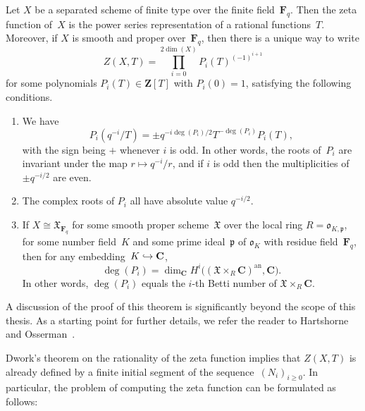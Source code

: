\begin{thm} \label{thm:01-Zetafunctions}
Let $X$ be a separated scheme of finite type over the finite 
field~$\mathbf{F}_q$.  Then the zeta function of~$X$ is the power series 
representation of a rational functions~$T$.  Moreover, if $X$ is smooth 
and proper over~$\mathbf{F}_q$, then there is a unique way to write 
\begin{equation}
Z(X, T) = \prod_{i=0}^{2 \dim(X)} P_i(T)^{(-1)^{i+1}}
\end{equation}
for some polynomials $P_i(T) \in \mathbf{Z}[T]$ with $P_i(0) = 1$, 
satisfying the following conditions.
\begin{enumerate}
\item We have 
\begin{equation*}
P_i(q^{-i} / T) = \pm q^{-i \deg(P_i) / 2} T^{- \deg(P_i)} P_i(T),
\end{equation*}
with the sign being $+$ whenever $i$ is odd.  In other words, the roots 
of~$P_i$ are invariant under the map $r \mapsto q^{-i} / r$, and if $i$ 
is odd then the multiplicities of $\pm q^{-i/2}$ are even.
\item The complex roots of $P_i$ all have absolute value $q^{-i/2}$.
\item If $X \cong \mathfrak{X}_{\mathbf{F}_q}$ for some smooth proper 
scheme~$\mathfrak{X}$ over the local ring $R = \mathfrak{o}_{K,\mathfrak{p}}$, 
for some number field~$K$ and some prime ideal~$\mathfrak{p}$ of 
$\mathfrak{o}_K$ with residue field~$\mathbf{F}_q$, then for any 
embedding~$K \hookrightarrow \mathbf{C}$, 
\begin{equation*}
\deg(P_i) = \dim_{\mathbf{C}} H^{i} \bigl( (\mathfrak{X} \times_R \mathbf{C})^{\text{an}}, \mathbf{C} \bigr).
\end{equation*}
In other words, $\deg(P_i)$ equals the $i$-th Betti number of 
$\mathfrak{X} \times_{R} \mathbf{C}$.
\end{enumerate}
\end{thm}

A discussion of the proof of this theorem is significantly 
beyond the scope of this thesis.  As a starting point for 
further details, we refer the reader to 
Hartshorne~\citep[Appendix~C]{Har77} and Osserman~\citep{Osserman2008}.

Dwork's theorem on the rationality of the zeta function implies 
that $Z(X, T)$ is already defined by a finite initial segment of 
the sequence~$(N_i)_{i \geq 0}$.  In particular, the problem of 
computing the zeta function can be formulated as follows:

